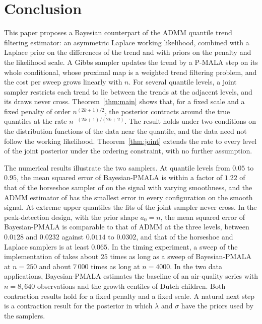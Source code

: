 
\section{Conclusion}
\label{sec:discussion}

This paper proposes a Bayesian counterpart of the ADMM quantile trend filtering estimator: an asymmetric Laplace working likelihood, combined with a Laplace prior on the differences of the trend and with priors on the penalty and the likelihood scale. A Gibbs sampler updates the trend by a P-MALA step on its whole conditional, whose proximal map is a weighted trend filtering problem, and the cost per sweep grows linearly with $n$. For several quantile levels, a joint sampler restricts each trend to lie between the trends at the adjacent levels, and its draws never cross. Theorem~\ref{thm:main} shows that, for a fixed scale and a fixed penalty of order $n^{(2k+1)/2}$, the posterior contracts around the true quantiles at the rate $n^{-(2k+1)/(2k+2)}$. The result holds under two conditions on the distribution functions of the data near the quantile, and the data need not follow the working likelihood. Theorem~\ref{thm:joint} extends the rate to every level of the joint posterior under the ordering constraint, with no further assumption.

The numerical results illustrate the two samplers. At quantile levels from $0.05$ to $0.95$, the mean squared error of Bayesian-PMALA is within a factor of $1.22$ of that of the horseshoe sampler of \citet{onizuka2024fast} on the signal with varying smoothness, and the ADMM estimator of \citet{brantley2020baseline} has the smallest error in every configuration on the smooth signal. At extreme upper quantiles the fits of the joint sampler never cross. In the peak-detection design, with the prior shape $a_0 = n$, the mean squared error of Bayesian-PMALA is comparable to that of ADMM at the three levels, between $0.0128$ and $0.0232$ against $0.0114$ to $0.0302$, and that of the horseshoe and Laplace samplers is at least $0.065$. In the timing experiment, a sweep of the implementation of \citet{onizuka2024fast} takes about $25$ times as long as a sweep of Bayesian-PMALA at $n=250$ and about $7\,000$ times as long at $n=4000$. In the two data applications, Bayesian-PMALA estimates the baseline of an air-quality series with $n = 8{,}640$ observations and the growth centiles of Dutch children. Both contraction results hold for a fixed penalty and a fixed scale. A natural next step is a contraction result for the posterior in which $\lambda$ and $\sigma$ have the priors used by the samplers.

